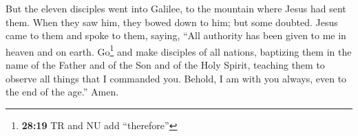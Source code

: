  But the eleven disciples went into Galilee, to the
mountain where Jesus had sent them.  When they saw him,
they bowed down to him; but some doubted.  Jesus came to
them and spoke to them, saying, ``All authority has been given to me in
heaven and on earth.  Go\footnote{\textbf{28:19} TR and
  NU add ``therefore''} and make disciples of all nations, baptizing
them in the name of the Father and of the Son and of the Holy Spirit,
 teaching them to observe all things that I commanded
you. Behold, I am with you always, even to the end of the age.'' Amen.
